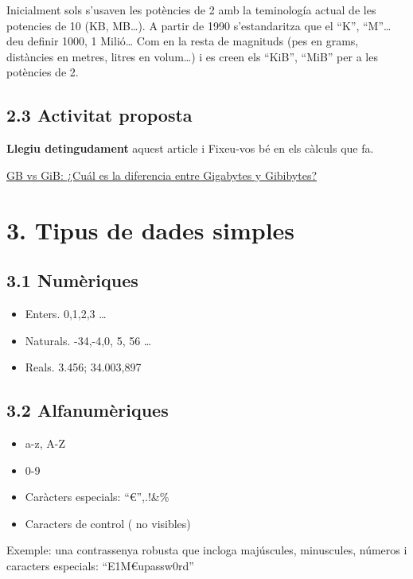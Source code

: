 \documentclass[
  12 pt,
  a4paper,
]{article}
\providecommand{\tightlist}{%
  \setlength{\itemsep}{0pt}\setlength{\parskip}{0pt}}
\begin{document}
Inicialment sols s'usaven les potències de 2 amb la teminología actual
de les potencies de 10 (KB, MB\ldots). A partir de 1990 s'estandaritza
que el ``K'', ``M''\ldots{} deu definir 1000, 1 Milió\ldots{} Com en la
resta de magnituds (pes en grams, distàncies en metres, litres en
volum\ldots) i es creen els ``KiB'', ``MiB'' per a les potències de 2.

\subsection{2.3 Activitat proposta}\label{activitat-proposta}

\textbf{Llegiu detingudament} aquest article i Fixeu-vos bé en els
càlculs que fa.

\href{https://massive.io/es/transferencia-de-archivos/gb-vs-gib/\#how-did-gibs-come-to-be}{GB
vs GiB: ¿Cuál es la diferencia entre Gigabytes y Gibibytes?}

\section{3. Tipus de dades simples}\label{tipus-de-dades-simples}

\subsection{3.1 Numèriques}\label{numuxe8riques}

\begin{itemize}
\tightlist
\item
  Enters. 0,1,2,3 \ldots{}
\item
  Naturals. -34,-4,0, 5, 56 \ldots{}
\item
  Reals. 3.456; 34.003,897
\end{itemize}

\subsection{3.2 Alfanumèriques}\label{alfanumuxe8riques}

\begin{itemize}
\tightlist
\item
  a-z, A-Z
\item
  0-9
\item
  Caràcters especials: ``€'',.!\&\%
\item
  Caracters de control ( no visibles)
\end{itemize}

Exemple: una contrassenya robusta que incloga majúscules, minuscules,
números i caracters especials: ``E1M€upassw0rd''
\end{document}
